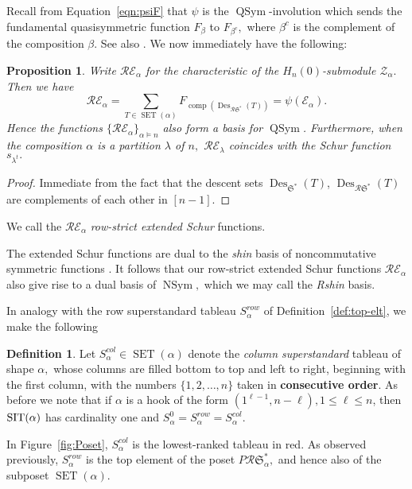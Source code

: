\documentclass[12pt,letterpaper]{amsart}
\newtheorem{proposition}[theorem]{Proposition}
\theoremstyle{definition}
\newtheorem{definition}[theorem]{Definition}
\DeclareMathOperator{\comp}{comp}
\newcommand{\dI}{\mathfrak{S}^*}
\newcommand{\rdI}{\mathcal{R}\mathfrak{S}^*}
\DeclareMathOperator{\QSym}{QSym}
\DeclareMathOperator{\Des}{Des}
\newcommand{\SET}{\ensuremath{\operatorname{SET}}} \newcommand{\NSET}{\ensuremath{\operatorname{NSET}}}\newcommand{\SRCT}{\ensuremath{\operatorname{SRCT}}}
\newcommand{\Nsym}{\ensuremath{\operatorname{NSym}}}
\newcommand{\hn}{H_n(0)}
\begin{document}
Recall from Equation~\eqref{eqn:psiF} that $\psi$ is the $\QSym$-involution which sends the fundamental quasisymmetric function $F_\beta$ to $F_{\beta^c},$ where $\beta^c$ is the complement of the composition $\beta.$  See also \cite[Section 3.6]{LMvW2013}. 
We now immediately have the following:
\begin{proposition}\label{prop:rowstrict-ext-basis} Write $\mathcal{R}\mathcal{E}_\alpha$ for the characteristic of the $\hn$-submodule $\mathcal{Z}_\alpha.$ Then we have 
\[\mathcal{R}\mathcal{E}_\alpha=\sum_{T\in\SET(\alpha)} F_{\comp(\Des_{\rdI}(T))} = \psi(\mathcal{E}_\alpha).\]
 Hence the functions $\{\mathcal{R}\mathcal{E}_\alpha\}_{\alpha\vDash n}$ also form a basis for 
$\QSym$. Furthermore, 
when the composition $\alpha$  is a partition $\lambda$ of $n,$  $\mathcal{R}\mathcal{E}_\lambda$ coincides with the Schur function $s_{\lambda^t}.$
\end{proposition}

\begin{proof} Immediate from the fact that the descent sets $\Des_{\dI}(T)$, $\Des_{\rdI}(T)$ are complements of each other in $[n-1].$ 
\end{proof}

We call the  $\mathcal{R}\mathcal{E}_\alpha$  \textit{row-strict extended Schur} functions.

The extended Schur functions are dual to the \textit{shin} basis of noncommutative symmetric functions  \cite{CFLSX2014}.   It follows that our 
row-strict extended Schur functions $\mathcal{R}\mathcal{E}_\alpha$ also give rise to a dual basis of $\Nsym,$ which we may call the \textit{Rshin} basis.

In analogy with the row superstandard tableau $S^{row}_\alpha$ of Definition~\ref{def:top-elt}, we make the following 
\begin{definition}\label{def:column-bot-elt} Let
$S^{col}_\alpha\in\SET(\alpha)$ denote the \textit{column superstandard} tableau of shape $\alpha,$ whose columns are  filled   bottom to top and left to right, beginning with the first column, with the numbers $\{1,2,\ldots, n\}$  taken in \textbf{consecutive order}. 
As before we note that if $\alpha$ is a hook of the form $ (1^{\ell-1},n-\ell), 1\le \ell\le n$,  then $\operatorname{SIT}(\alpha)$ has cardinality one and $S^0_\alpha=S^{row}_\alpha=S^{col}_\alpha$.
\end{definition}
In Figure~\ref{fig:Poset}, $S^{col}_\alpha$ is the lowest-ranked  tableau in red.   As observed previously,  $S^{row}_\alpha$  is the top element  of the poset $P\rdI_\alpha,$ and hence also of the subposet $\SET(\alpha).$ 
\end{document}
